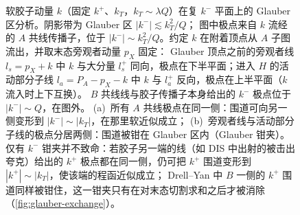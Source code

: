 \begin{figure}[htbp]
\caption{软胶子动量 $k$（固定 $k^+$、$k_T$，$k_T\sim\lambda Q$）在复 $k^-$ 平面上的 Glauber 区分析。阴影带为 Glauber 区 $|k^-|\lesssim k_T^2/Q$；
图中极点来自 $k$ 流经的 $A$ 共线传播子，位于 $|k^-|\sim k_T^2/Q$。约定 $k$ 在附着顶点从 $A$ 子图流出，并取末态旁观者动量 $p_X$ 固定：
Glauber 顶点之前的旁观者线 $l_s=p_X+k$ 中 $k$ 与大分量 $l_s^+$ 同向，极点在下半平面；进入 $H$ 的活动部分子线 $l_a=P_A-p_X-k$ 中 $k$ 与 $l_a^+$ 反向，极点在上半平面（$k$ 流入时上下互换）。
$B$ 共线线与胶子传播子本身给出的 $k^-$ 极点位于 $|k^-|\sim Q$，在图外。
(a)~所有 $A$ 共线极点在同一侧：围道可向另一侧变形到 $|k^-|\sim|k_T|$，在那里软近似成立；
(b)~旁观者线与活动部分子线的极点分居两侧：围道被钳在 Glauber 区内（Glauber 钳夹）。
仅有 $k^-$ 钳夹并不致命：若胶子另一端的线（如 DIS 中出射的被击出夸克）给出的 $k^+$ 极点都在同一侧，仍可把 $k^+$ 围道变形到 $|k^+|\sim|k_T|$，使该端的程函近似成立；
Drell--Yan 中 $B$ 一侧的 $k^+$ 围道同样被钳住，这一钳夹只有在对末态切割求和之后才被消除（\cref{fig:glauber-exchange}）。}
\label{fig:glauber-contour}
\end{figure}

